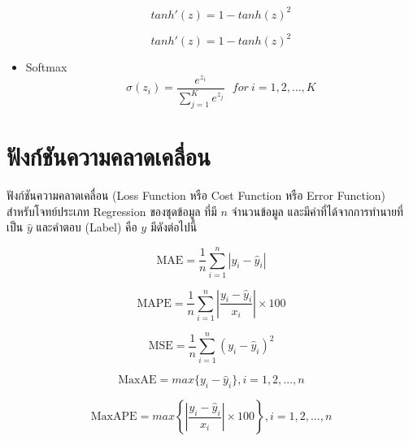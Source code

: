 \begin{itemize}
\begin{figure}[H]
\begin{subfigure}{0.5\textwidth}
            \caption{%
                \begin{equation}
                    tanh'(z) = 1 - tanh(z)^{2}
                \end{equation}
            }
            \label{fig:actfunc_tanh_der}
        \end{subfigure}
    \end{figure}

    \item Softmax
    \begin{equation}
        \sigma(z_i) = \frac{e^{z_{i}}}{\sum_{j=1}^K e^{z_{j}}} \ \ \ for\ i=1,2,\dots,K
    \end{equation}
\end{itemize}

\section{ฟังก์ชันความคลาดเคลื่อน}
\label{sec:loss_func}

ฟังก์ชันความคลาดเคลื่อน (Loss Function หรือ Cost Function หรือ Error Function) สำหรับโจทย์ประเภท Regression ของชุดข้อมูล%
ที่มี $n$ จำนวนข้อมูล และมีค่าที่ได้จากการทำนายที่เป็น $\hat{y}$ และคำตอบ (Label) คือ $y$ มีดังต่อไปนี้

\begin{equation}\label{eq:mae}
    \text{MAE} = \frac{1}{n} \sum_{i=1}^{n} | y_{i} - \hat{y}_{i} |
\end{equation}

\begin{equation}\label{eq:mape}
    \text{MAPE} = \frac{1}{n} \sum_{i=1}^{n} \left| \frac{y_{i} - \hat{y}_{i}}{x_{i}} \right| \times 100
\end{equation}

\begin{equation}\label{eq:mse}
    \text{MSE} = \frac{1}{n} \sum_{i=1}^{n} \left( y_{i} - \hat{y}_{i} \right)^2
\end{equation}

\begin{equation}\label{eq:maxae}
    \text{MaxAE} = max\{y_{i} - \hat{y}_{i}\}, i = 1, 2, ..., n
\end{equation}

\begin{equation}\label{eq:maxape}
    \text{MaxAPE} = max\left\{\left| \frac{y_{i} - \hat{y}_{i}}{x_{i}} \right| \times 100 \right\}, i = 1, 2, ..., n
\end{equation}

